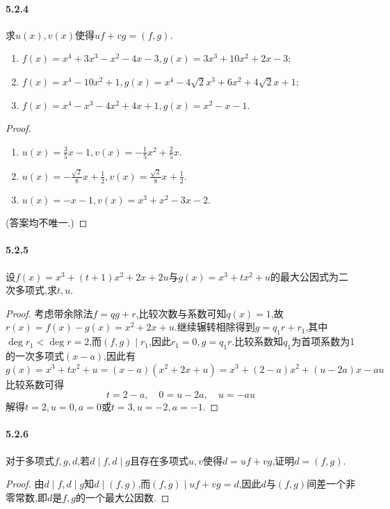 \documentclass[11pt]{article}
\begin{document}
\paragraph{5.2.4}求$u(x),v(x)$使得$uf+vg=(f,g)$.
\begin{enumerate}
    \item $f(x)=x^4+3x^3-x^2-4x-3, g(x)=3x^3+10x^2+2x-3$;
    \item $f(x)=x^4-10x^2+1, g(x)=x^4-4\sqrt{2}x^3+6x^2+4\sqrt{2}x+1$;
    \item $f(x)=x^4-x^3-4x^2+4x+1, g(x)=x^2-x-1$.
\end{enumerate}
\begin{proof}
    \begin{enumerate}
        \item $u(x)=\frac{3}{5}x-1, v(x)=-\frac{1}{5}x^2+\frac{2}{5}x$.
        \item $u(x)=-\frac{\sqrt{2}}{8}x+\frac{1}{2}, v(x)=\frac{\sqrt{2}}{8}x+\frac{1}{2}$.
        \item $u(x)=-x-1, v(x)=x^3+x^2-3x-2$.
    \end{enumerate}
    (答案均不唯一.)
\end{proof}
\paragraph{5.2.5}设$f(x)=x^3+(t+1)x^2+2x+2u$与$g(x)=x^3+tx^2+u$的最大公因式为二次多项式,求$t,u$.
\begin{proof}
    考虑带余除法$f=qg+r$,比较次数与系数可知$q(x)=1$,故$r(x)=f(x)-g(x)=x^2+2x+u$.继续辗转相除得到$g=q_1r+r_1$,其中$\deg r_1<\deg r=2$,而$(f,g)\mid r_1$,因此$r_1=0, g=q_1r$.比较系数知$q_1$为首项系数为1的一次多项式$(x-a)$,因此有
    $$g(x)=x^3+tx^2+u=(x-a)(x^2+2x+u)=x^3+(2-a)x^2+(u-2a)x-au$$
    比较系数可得
    $$t=2-a,\quad 0=u-2a,\quad u=-au$$
    解得$t=2, u=0, a=0$或$t=3, u=-2, a=-1$.
\end{proof}
\paragraph{5.2.6}对于多项式$f,g,d$,若$d\mid f, d\mid g$且存在多项式$u,v$使得$d=uf+vg$,证明$d=(f,g)$.
\begin{proof}
    由$d\mid f, d\mid g$知$d\mid (f,g)$,而$(f,g)\mid uf+vg=d$,因此$d$与$(f,g)$间差一个非零常数,即$d$是$f,g$的一个最大公因数.
\end{proof}
\end{document}
